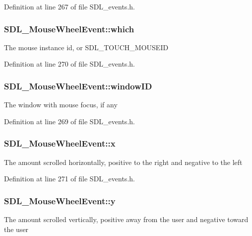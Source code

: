 Definition at line 267 of file S\-D\-L\-\_\-events.\-h.

\hypertarget{struct_s_d_l___mouse_wheel_event_a014dc767d52e8b75ba26a5f12e1704e8}{
\subsubsection[{which}]{ S\-D\-L\-\_\-\-Mouse\-Wheel\-Event\-::which}}\label{struct_s_d_l___mouse_wheel_event_a014dc767d52e8b75ba26a5f12e1704e8}
The mouse instance id, or S\-D\-L\-\_\-\-T\-O\-U\-C\-H\-\_\-\-M\-O\-U\-S\-E\-I\-D 

Definition at line 270 of file S\-D\-L\-\_\-events.\-h.

\hypertarget{struct_s_d_l___mouse_wheel_event_ab45eb1895217214ecb773fc555e08f6c}{
\subsubsection[{window\-I\-D}]{ S\-D\-L\-\_\-\-Mouse\-Wheel\-Event\-::window\-I\-D}}\label{struct_s_d_l___mouse_wheel_event_ab45eb1895217214ecb773fc555e08f6c}
The window with mouse focus, if any 

Definition at line 269 of file S\-D\-L\-\_\-events.\-h.

\hypertarget{struct_s_d_l___mouse_wheel_event_a6d904eef474ea45a5b1828fcb5b0f859}{
\subsubsection[{x}]{ S\-D\-L\-\_\-\-Mouse\-Wheel\-Event\-::x}}\label{struct_s_d_l___mouse_wheel_event_a6d904eef474ea45a5b1828fcb5b0f859}
The amount scrolled horizontally, positive to the right and negative to the left 

Definition at line 271 of file S\-D\-L\-\_\-events.\-h.

\hypertarget{struct_s_d_l___mouse_wheel_event_a53fdf77a464426bc8b30e629795f044b}{
\subsubsection[{y}]{ S\-D\-L\-\_\-\-Mouse\-Wheel\-Event\-::y}}\label{struct_s_d_l___mouse_wheel_event_a53fdf77a464426bc8b30e629795f044b}
The amount scrolled vertically, positive away from the user and negative toward the user 

